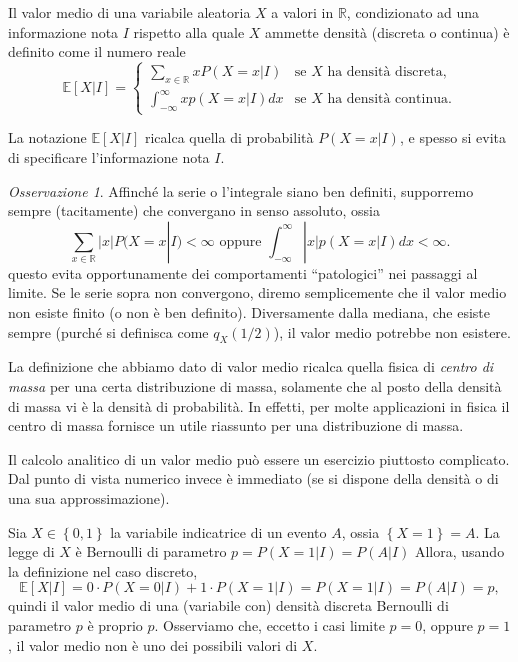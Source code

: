 \documentclass[
  italian,
  letterpaper,
]{book}
\newcommand{\sqa}[1]{\left[ #1 \right]}
\newcommand{\cur}[1]{\left\{ #1 \right\}}
\newcommand{\R}{\mathbb{R}}
\newcommand{\E}[1]{\mathbb{E}\sqa{#1}}
\theoremstyle{definition}
\theoremstyle{remark}
\newtheorem*{remark}{Osservazione}
\begin{document}
Il valor medio di una variabile aleatoria \(X\) a valori in \(\R\),
condizionato ad una informazione nota \(I\) rispetto alla quale \(X\)
ammette densità (discreta o continua) è definito come il numero reale
\[ \E{ X | I} = \begin{cases} \sum_{x \in \R} x P(X = x|I ) & \text{se $X$ ha densità discreta,}\\ 
\int_{-\infty}^\infty x p(X=x|I) d x & \text{se $X$ ha densità continua.}\end{cases}\]

La notazione \(\E{X | I}\) ricalca quella di probabilità \(P(X=x|I)\), e
spesso si evita di specificare l'informazione nota \(I\).

\begin{remark}
Affinché la serie o l'integrale siano ben definiti, supporremo sempre
(tacitamente) che convergano in senso assoluto, ossia
\[ \sum_{x \in \R} |x| P(X = x|I )  < \infty  \text{ oppure } \int_{-\infty}^\infty |x| p(X=x|I) d x <\infty.\]
questo evita opportunamente dei comportamenti ``patologici'' nei
passaggi al limite. Se le serie sopra non convergono, diremo
semplicemente che il valor medio non esiste finito (o non è ben
definito). Diversamente dalla mediana, che esiste sempre (purché si
definisca come \(q_X(1/2)\)), il valor medio potrebbe non esistere.
\end{remark}

La definizione che abbiamo dato di valor medio ricalca quella fisica di
\emph{centro di massa} per una certa distribuzione di massa, solamente
che al posto della densità di massa vi è la densità di probabilità. In
effetti, per molte applicazioni in fisica il centro di massa fornisce un
utile riassunto per una distribuzione di massa.

Il calcolo analitico di un valor medio può essere un esercizio piuttosto
complicato. Dal punto di vista numerico invece è immediato (se si
dispone della densità o di una sua approssimazione).

Sia \(X\in \cur{0,1}\) la variabile indicatrice di un evento \(A\),
ossia \(\cur{X=1} = A\). La legge di \(X\) è Bernoulli di parametro
\(p = P(X=1|I) = P(A|I)\) Allora, usando la definizione nel caso
discreto,
\[ \E{X|I} = 0\cdot P(X= 0|I) + 1 \cdot P(X=1|I) = P(X=1|I) = P(A|I) = p,\]
quindi il valor medio di una (variabile con) densità discreta Bernoulli
di parametro \(p\) è proprio \(p\). Osserviamo che, eccetto i casi
limite \(p =0\), oppure \(p=1\), il valor medio non è uno dei possibili
valori di \(X\).
\end{document}
